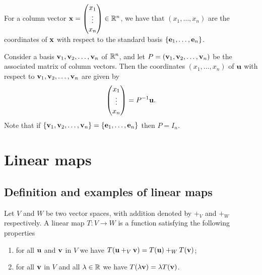 \documentclass[10pt, a4paper]{article}
\begin{document}
For a column vector $\mathbf{x} = \begin{pmatrix}
    x_1 \\ \vdots \\ x_n
\end{pmatrix} \in \mathbb{R} ^ n$,
we have that $(x_1, \dotsc, x_n)$ are the coordinates of $\mathbf{x}$ with respect to the standard basis $\{\mathbf{e}_1, \dotsc, \mathbf{e}_n\}$.

\begin{lemma}
    Consider a basis $\mathbf{v}_1, \mathbf{v}_2, \dotsc, \mathbf{v}_n$ of $\mathbb{R} ^ n$,
    and let $P = (\mathbf{v}_1, \mathbf{v}_2, \dotsc, \mathbf{v}_n)$ be the associated matrix of column vectors.
    Then the coordinates $(x_1, \dotsc, x_n)$ of $\mathbf{u}$ with respect to $\mathbf{v}_1, \mathbf{v}_2, \dotsc, \mathbf{v}_n$ are given by
    \[
    \begin{pmatrix}
        x_1 \\ \vdots \\ x_n
    \end{pmatrix} = P ^ {-1}\mathbf{u}.
    \]
    Note that if $\{\mathbf{v}_1, \mathbf{v}_2, \dotsc, \mathbf{v}_n\} = \{\mathbf{e}_1, \dotsc, \mathbf{e}_n\}$ then $P = I_n$.
\end{lemma}

\newpage

\section{Linear maps}

\subsection{Definition and examples of linear maps}

\begin{definition}
    Let $V$ and $W$ be two vector spaces,
    with addition denoted by $+_{V}$ and $+_{W}$ respectively.
    A linear map $T : V \rightarrow W$ is a function satisfying the following properties
    \begin{enumerate}[label = (\roman*)]
        \item for all $\mathbf{u}$ and $\mathbf{v}$ in $V$ we have $T(\mathbf{u} +_{V} \mathbf{v}) = T(\mathbf{u}) +_{W} T(\mathbf{v})$;
        \item for all $\mathbf{v}$ in $V$ and all $\lambda \in \mathbb{R}$ we have $T(\lambda\mathbf{v}) = \lambda T(\mathbf{v})$.
    \end{enumerate}
\end{definition}
\end{document}
